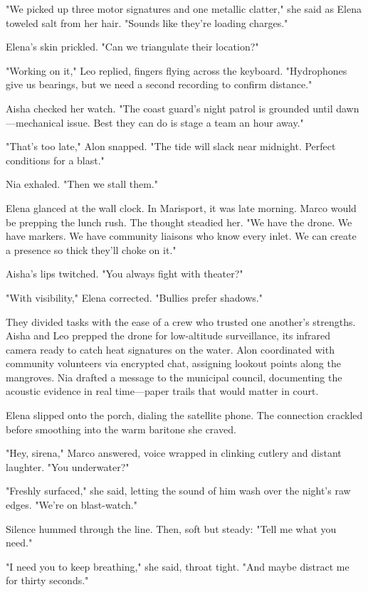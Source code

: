"We picked up three motor signatures and one metallic clatter," she said as Elena toweled salt from her hair. "Sounds like they're loading charges."

Elena's skin prickled. "Can we triangulate their location?"

"Working on it," Leo replied, fingers flying across the keyboard. "Hydrophones give us bearings, but we need a second recording to confirm distance."

Aisha checked her watch. "The coast guard's night patrol is grounded until dawn—mechanical issue. Best they can do is stage a team an hour away."

"That's too late," Alon snapped. "The tide will slack near midnight. Perfect conditions for a blast."

Nia exhaled. "Then we stall them."

Elena glanced at the wall clock. In Marisport, it was late morning. Marco would be prepping the lunch rush. The thought steadied her. "We have the drone. We have markers. We have community liaisons who know every inlet. We can create a presence so thick they'll choke on it."

Aisha's lips twitched. "You always fight with theater?"

"With visibility," Elena corrected. "Bullies prefer shadows."

They divided tasks with the ease of a crew who trusted one another's strengths. Aisha and Leo prepped the drone for low-altitude surveillance, its infrared camera ready to catch heat signatures on the water. Alon coordinated with community volunteers via encrypted chat, assigning lookout points along the mangroves. Nia drafted a message to the municipal council, documenting the acoustic evidence in real time—paper trails that would matter in court.

Elena slipped onto the porch, dialing the satellite phone. The connection crackled before smoothing into the warm baritone she craved.

"Hey, sirena," Marco answered, voice wrapped in clinking cutlery and distant laughter. "You underwater?"

"Freshly surfaced," she said, letting the sound of him wash over the night's raw edges. "We're on blast-watch."

Silence hummed through the line. Then, soft but steady: "Tell me what you need."

"I need you to keep breathing," she said, throat tight. "And maybe distract me for thirty seconds."


